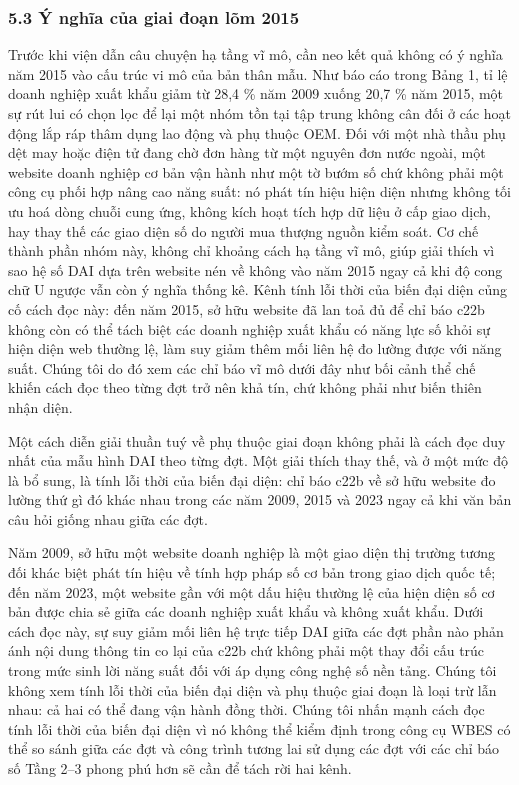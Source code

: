 \documentclass[12pt,a4paper]{article}
\begin{document}
\hypertarget{53-uxfd-nghux129a-cux1ee7a-giai-ux111oux1ea1n-luxf5m-2015}{%
\subsubsection{5.3 Ý nghĩa của giai đoạn lõm
2015}\label{53-uxfd-nghux129a-cux1ee7a-giai-ux111oux1ea1n-luxf5m-2015}}

Trước khi viện dẫn câu chuyện hạ tầng vĩ mô, cần neo kết quả không có ý
nghĩa năm 2015 vào cấu trúc vi mô của bản thân mẫu. Như báo cáo trong
Bảng 1, tỉ lệ doanh nghiệp xuất khẩu giảm từ 28,4 \% năm 2009 xuống 20,7
\% năm 2015, một sự rút lui có chọn lọc để lại một nhóm tồn tại tập
trung không cân đối ở các hoạt động lắp ráp thâm dụng lao động và phụ
thuộc OEM. Đối với một nhà thầu phụ dệt may hoặc điện tử đang chờ đơn
hàng từ một nguyên đơn nước ngoài, một website doanh nghiệp cơ bản vận
hành như một tờ bướm số chứ không phải một công cụ phối hợp nâng cao
năng suất: nó phát tín hiệu hiện diện nhưng không tối ưu hoá dòng chuỗi
cung ứng, không kích hoạt tích hợp dữ liệu ở cấp giao dịch, hay thay thế
các giao diện số do người mua thượng nguồn kiểm soát. Cơ chế thành phần
nhóm này, không chỉ khoảng cách hạ tầng vĩ mô, giúp giải thích vì sao hệ
số DAI dựa trên website nén về không vào năm 2015 ngay cả khi độ cong
chữ U ngược vẫn còn ý nghĩa thống kê. Kênh tính lỗi thời của biến đại
diện củng cố cách đọc này: đến năm 2015, sở hữu website đã lan toả đủ để
chỉ báo c22b không còn có thể tách biệt các doanh nghiệp xuất khẩu có
năng lực số khỏi sự hiện diện web thường lệ, làm suy giảm thêm mối liên
hệ đo lường được với năng suất. Chúng tôi do đó xem các chỉ báo vĩ mô
dưới đây như bối cảnh thể chế khiến cách đọc theo từng đợt trở nên khả
tín, chứ không phải như biến thiên nhận diện.

Một cách diễn giải thuần tuý về phụ thuộc giai đoạn không phải là cách
đọc duy nhất của mẫu hình DAI theo từng đợt. Một giải thích thay thế, và
ở một mức độ là bổ sung, là tính lỗi thời của biến đại diện: chỉ báo
c22b về sở hữu website đo lường thứ gì đó khác nhau trong các năm 2009,
2015 và 2023 ngay cả khi văn bản câu hỏi giống nhau giữa các đợt.

Năm 2009, sở hữu một website doanh nghiệp là một giao diện thị trường
tương đối khác biệt phát tín hiệu về tính hợp pháp số cơ bản trong giao
dịch quốc tế; đến năm 2023, một website gần với một dấu hiệu thường lệ
của hiện diện số cơ bản được chia sẻ giữa các doanh nghiệp xuất khẩu và
không xuất khẩu. Dưới cách đọc này, sự suy giảm mối liên hệ trực tiếp
DAI giữa các đợt phần nào phản ánh nội dung thông tin co lại của c22b
chứ không phải một thay đổi cấu trúc trong mức sinh lời năng suất đối
với áp dụng công nghệ số nền tảng. Chúng tôi không xem tính lỗi thời của
biến đại diện và phụ thuộc giai đoạn là loại trừ lẫn nhau: cả hai có thể
đang vận hành đồng thời. Chúng tôi nhấn mạnh cách đọc tính lỗi thời của
biến đại diện vì nó không thể kiểm định trong công cụ WBES có thể so
sánh giữa các đợt và công trình tương lai sử dụng các đợt với các chỉ
báo số Tầng 2--3 phong phú hơn sẽ cần để tách rời hai kênh.
\end{document}
